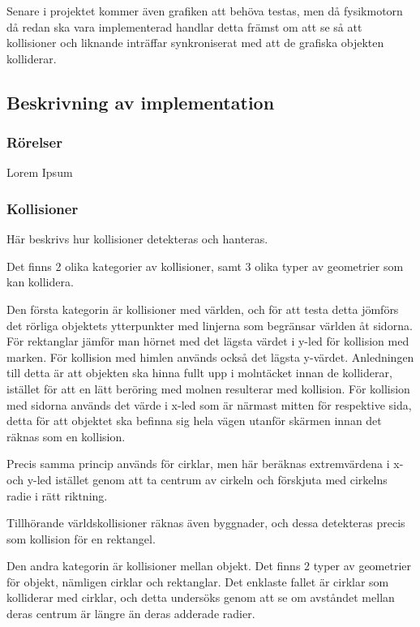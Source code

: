 \documentclass[12pt,a4paper]{article}
\newcounter{subsubsubsection}[subsubsection]
\begin{document}
Senare i projektet kommer även grafiken att behöva testas, men då fysikmotorn då redan ska vara implementerad handlar detta främst om att se så att kollisioner och liknande inträffar synkroniserat med att de grafiska objekten kolliderar. \\

\subsection{Beskrivning av implementation}


\subsubsection{Rörelser}
Lorem Ipsum


\subsubsection{Kollisioner}
Här beskrivs hur kollisioner detekteras och hanteras.


Det finns 2 olika kategorier av kollisioner, samt 3 olika typer av geometrier som kan kollidera.

Den första kategorin är kollisioner med världen, och för att testa detta jömförs det rörliga objektets ytterpunkter med linjerna som begränsar världen åt sidorna. För rektanglar jämför man hörnet med det lägsta värdet i y-led för kollision med marken. För kollision med himlen används också det lägsta y-värdet. Anledningen till detta är att objekten ska hinna fullt upp i molntäcket innan de kolliderar, istället för att en lätt beröring med molnen resulterar med kollision. För kollision med sidorna används det värde i x-led som är närmast mitten för respektive sida, detta för att objektet ska befinna sig hela vägen utanför skärmen innan det räknas som en kollision.

Precis samma princip används för cirklar, men här beräknas extremvärdena i x- och y-led istället genom att ta centrum av cirkeln och förskjuta med cirkelns radie i rätt riktning.

Tillhörande världskollisioner räknas även byggnader, och dessa detekteras precis som kollision för en rektangel.

\vspace{0.2cm}

Den andra kategorin är kollisioner mellan objekt. Det finns 2 typer av geometrier för objekt, nämligen cirklar och rektanglar. Det enklaste fallet är cirklar som kolliderar med cirklar, och detta undersöks genom att se om avståndet mellan deras centrum är längre än deras adderade radier.
\end{document}

